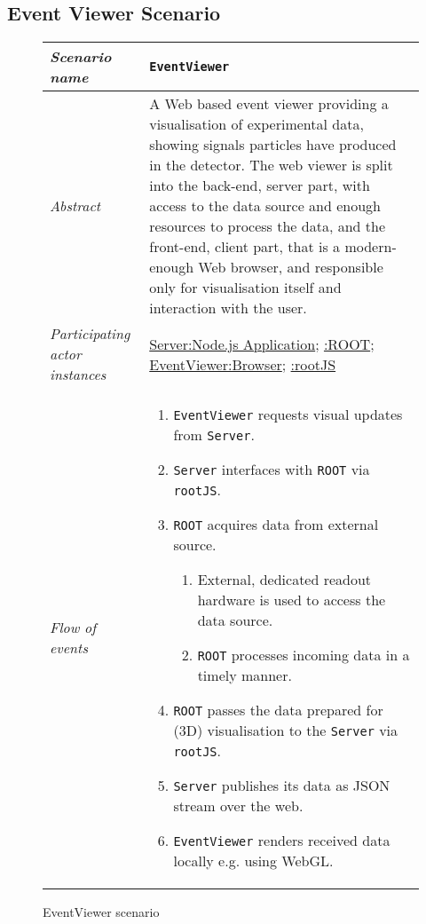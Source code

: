 \subsection{Event Viewer Scenario}
\begin{figure}[htb]
	\centering
	\begin{longtable}{p{3cm} @{\hskip 1cm} p{12cm}}
		\hline
		\textit{Scenario name} & \texttt{EventViewer}\\
		\hline
		\textit{Abstract} &
		A Web based event viewer providing a visualisation of experimental data, showing signals particles have produced in the detector.
		The web viewer is split into the back-end, server part, with access to
	    the data source and enough resources to process the data, and the front-end, client part, that is a modern-enough Web browser, and responsible only for visualisation itself and interaction with the user.
		\\
		\hline
		\textit{Participating actor instances} & 
		\underline{Server:Node.js Application}; \underline{:ROOT}; \underline{EventViewer:Browser}; \underline{:rootJS}\\
		\hline
		\textit{Flow of events} &
		\begin{enumerate}
			\item \texttt{EventViewer} requests visual updates from \texttt{Server}.
			\item \texttt{Server} interfaces with \texttt{ROOT} via \texttt{rootJS}.
			\item \texttt{ROOT} acquires data from external source.
			\begin{enumerate}
					\item External, dedicated readout hardware is used to access the data source.
					\item \texttt{ROOT} processes incoming data in a timely manner.
			\end{enumerate}
			\item \texttt{ROOT} passes the data prepared for (3D) visualisation to the \texttt{Server} via \texttt{rootJS}.
			\item \texttt{Server} publishes its data as JSON stream over the web.
			\item \texttt{EventViewer} renders received data locally e.g. using WebGL.
		\end{enumerate}
		\\
		\hline
	\end{longtable}
	\caption{EventViewer scenario}
\end{figure}